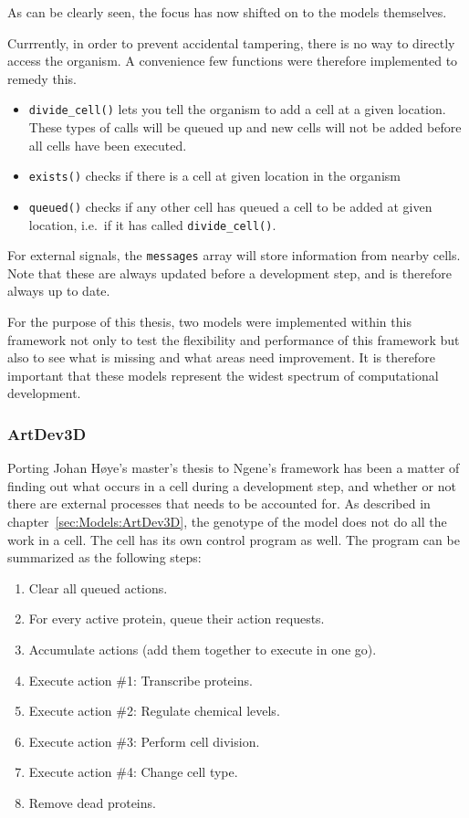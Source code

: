\noindent As can be clearly seen, the focus has now shifted on to the models themselves.

Currrently, in order to prevent accidental tampering, there is no way to directly access the organism. A convenience few functions were therefore implemented to remedy this.

\begin{itemize}
	\itemsep=0pt
	\item\texttt{divide\_cell()} lets you tell the organism to add a cell at a given location. These types of calls will be queued up and new cells will not be added before all cells have been executed.
	\item\texttt{exists()} checks if there is a cell at given location in the organism
	\item\texttt{queued()} checks if any other cell has queued a cell to be added at given location, i.e.\ if it has called \texttt{divide\_cell()}.
\end{itemize}

For external signals, the \texttt{messages} array will store information from nearby cells. Note that these are always updated before a development step, and is therefore always up to date.

For the purpose of this thesis, two models were implemented within this framework not only to test the flexibility and performance of this framework but also to see what is missing and what areas need improvement. It is therefore important that these models represent the widest spectrum of computational development.


\subsubsection{ArtDev3D}
\label{sec:Implementation:ArtDev3D}
Porting Johan H{\o}ye's master's thesis\cite{hoye2006} to Ngene's framework has been a matter of finding out what occurs in a cell during a development step, and whether or not there are external processes that needs to be accounted for. As described in chapter~\ref{sec:Models:ArtDev3D}, the genotype of the model does not do all the work in a cell. The cell has its own control program as well. The program can be summarized as the following steps:

\begin{enumerate}
	\itemsep=0pt
	\item Clear all queued actions.
	\item For every active protein, queue their action requests.
	\item Accumulate actions (add them together to execute in one go).
	\item Execute action \#1: Transcribe proteins.
	\item Execute action \#2: Regulate chemical levels.
	\item Execute action \#3: Perform cell division.
	\item Execute action \#4: Change cell type.
	\item Remove dead proteins.
\end{enumerate}

